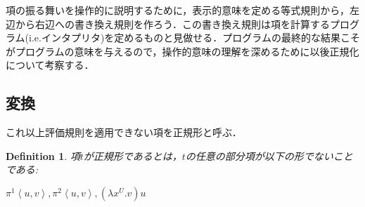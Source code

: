 \documentclass[a4paper,10pt,platex, dvipdfmx]{jsarticle}
\newtheorem{definition}{Definition}
\begin{document}
項の振る舞いを操作的に説明するために，表示的意味を定める等式規則から，左辺から右辺への書き換え規則を作ろう．この書き換え規則は項を計算するプログラム(i.e.インタプリタ)を定めるものと見做せる．プログラムの最終的な結果こそがプログラムの意味を与えるので，操作的意味の理解を深めるために以後正規化について考察する．

\subsection{変換}
これ以上評価規則を適用できない項を正規形と呼ぶ．
 \begin{definition}
 項$t$が正規形であるとは，$t$の任意の部分項が以下の形でないことである:
 
 $\pi^{1}\left<u, v\right>, \pi^{2}\left<u, v\right>, (\lambda x^{U}.v)u$
 \end{definition}
\end{document}

